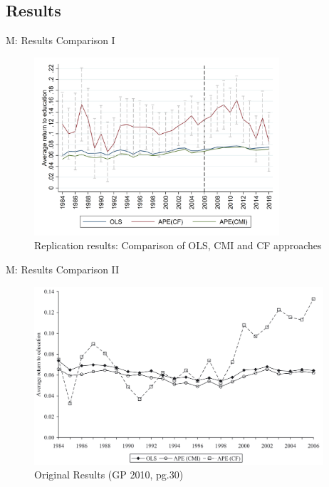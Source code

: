 \documentclass[10pt,ignorenonframetext,]{beamer}
\begin{document}
\hypertarget{results}{%
\subsection{Results}\label{results}}

\begin{frame}{M: Results Comparison I}
\protect\hypertarget{m-results-comparison-i}{}

\begin{figure}
\centering
\includegraphics[width=\textwidth,height=2.60417in]{img/results.png}
\caption{Replication results: Comparison of OLS, CMI and CF approaches}
\end{figure}

\end{frame}

\begin{frame}{M: Results Comparison II}
\protect\hypertarget{m-results-comparison-ii}{}

\begin{figure}
\centering
\includegraphics[width=\textwidth,height=2.60417in]{img/OLS_CMI_CF_GB2010.png}
\caption{Original Results (GP 2010, pg.30)}
\end{figure}

\end{frame}
\end{document}
